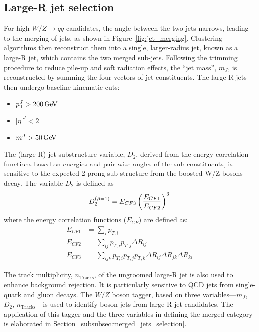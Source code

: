 \clearpage
\subsection{Large-R jet selection}
\label{subsec:large-Rjet}
For high-\pt $W/Z \to qq$ candidates, the angle between the two jets narrows, leading to the merging of jets, as shown in Figure~\ref{fig:jet_merging}. Clustering algorithms then reconstruct them into a single, larger-radius jet, known as a large-R jet, which contains the two merged sub-jets.
Following the trimming procedure\cite{Krohn:2009th} to reduce pile-up and soft radiation effects, the ``jet mass'', $m_J$, 
is reconstructed by summing the four-vectors of jet constituents. The large-R jets then undergo baseline kinematic cuts:

        \begin{itemize}
                \item $p_{\text{T}}^{J} > 200 \, \text{Ge\kern -0.1em V}$
                \item $|\eta|^{J} < 2$
                \item $m^{J} > 50 \, \text{Ge\kern -0.1em V}$
        \end{itemize}

The (large-R) jet substructure variable, $D_{2}$, derived from the energy correlation functions based on energies and pair-wise angles of the sub-constituents\cite{Larkoski:2014gra,Larkoski:2015kga}, is sensitive to the expected 2-prong sub-structure from the boosted W/Z bosons decay. The variable $D_{2}$ is defined as
\begin{equation}
D^{(\beta=1)}_2 = E_{CF3} \left( \frac{E_{CF1}}{E_{CF2}} \right)^3 \\
\end{equation}
where the energy correlation functions ($E_{CF}$) are defined as:
\begin{equation}
\begin{aligned}
E_{CF1} &= \sum_{i} p_{T,i} \\
E_{CF2} &= \sum_{ij} p_{T,i}p_{T,j} \Delta R_{ij} \\
E_{CF3} &= \sum_{ijk} p_{T,i}p_{T,j}p_{T,k} \Delta R_{ij} \Delta R_{jk} \Delta R_{ki}
\end{aligned}
\end{equation}

The track multiplicity, $n_{\text{Tracks}}$, of the ungroomed large-R jet is also used to enhance background rejection. It is particularly sensitive to QCD jets from single-quark and gluon decays. 
The $W/Z$ boson tagger, based on three variables—$m_J$, $D_{2}$, $n_{\text{Tracks}}$—is used to identify boson jets from large-R jet candidates. The application of this tagger and the three variables in defining the merged category is elaborated in Section~\ref{subsubsec:merged_jets_selection}.

